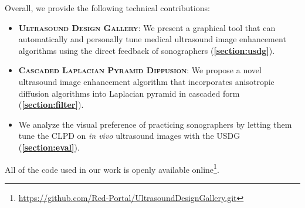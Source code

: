 Overall, we provide the following technical contributions:
\begin{itemize}
  \item[\ding{228}] \textsc{\textbf{Ultrasound Design Gallery}}: We present a graphical tool that can automatically and personally tune medical ultrasound image enhancement algorithms using the direct feedback of sonographers (\textbf{\cref{section:usdg}}).
    \vspace{0.02in}
  \item[\ding{228}] \textsc{\textbf{Cascaded Laplacian Pyramid Diffusion}}:  We propose a novel ultrasound image enhancement algorithm that incorporates anisotropic diffusion algorithms into Laplacian pyramid in cascaded form (\textbf{\cref{section:filter}}).
  \item[\ding{228}] We analyze the visual preference of practicing sonographers by letting them tune the CLPD on \textit{in vivo} ultrasound images with the USDG (\textbf{\cref{section:eval}}).
\end{itemize}
All of the code used in our work is openly available online\footnote{\url{https://github.com/Red-Portal/UltrasoundDesignGallery.git}}.






